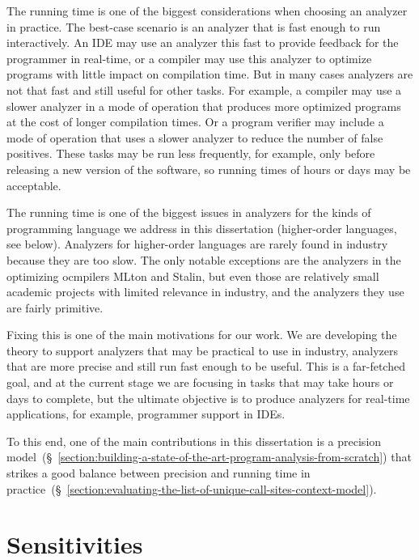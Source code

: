 \documentclass[12pt, oneside]{book}
\begin{document}
The running time is one of the biggest considerations when choosing an analyzer in practice. The best-case scenario is an analyzer that is fast enough to run interactively. An IDE may use an analyzer this fast to provide feedback for the programmer in real-time, or a compiler may use this analyzer to optimize programs with little impact on compilation time. But in many cases analyzers are not that fast and still useful for other tasks. For example, a compiler may use a slower analyzer in a mode of operation that produces more optimized programs at the cost of longer compilation times. Or a program verifier may include a mode of operation that uses a slower analyzer to reduce the number of false positives. These tasks may be run less frequently, for example, only before releasing a new version of the software, so running times of hours or days may be acceptable.

The running time is one of the biggest issues in analyzers for the kinds of programming language we address in this dissertation (higher-order languages, see below). Analyzers for higher-order languages are rarely found in industry because they are too slow. The only notable exceptions are the analyzers in the optimizing ocmpilers MLton and Stalin, but even those are relatively small academic projects with limited relevance in industry, and the analyzers they use are fairly primitive.

Fixing this is one of the main motivations for our work. We are developing the theory to support analyzers that may be practical to use in industry, analyzers that are more precise and still run fast enough to be useful. This is a far-fetched goal, and at the current stage we are focusing in tasks that may take hours or days to complete, but the ultimate objective is to produce analyzers for real-time applications, for example, programmer support in IDEs.

To this end, one of the main contributions in this dissertation is a precision model~(§~\ref{section:building-a-state-of-the-art-program-analysis-from-scratch}) that strikes a good balance between precision and running time in practice~(§~\ref{section:evaluating-the-list-of-unique-call-sites-context-model}).

\section{Sensitivities}
\label{section:sensitivities}
\end{document}
